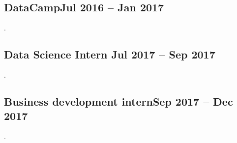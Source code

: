 \documentclass[a4paper,12pt]{article}
\begin{document}
\vspace*{10pt}
\subsection{{DataCamp}\hfill Jul 2016 -- Jan 2017}
\begin{zitemize}
    \item .
\end{zitemize}
\vspace*{6pt}
\subsection{{Data Science Intern }\hfill Jul 2017 -- Sep 2017}
\begin{zitemize}
    \item .
\end{zitemize}
\vspace*{6pt}
\subsection{{Business development intern}\hfill Sep 2017 -- Dec 2017}
\begin{zitemize}
    \item .
\end{zitemize}
\end{document}
